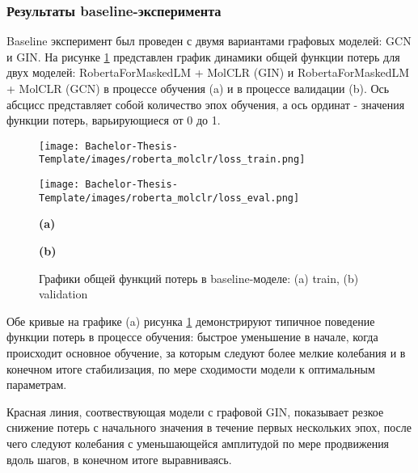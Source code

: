 \subsubsection{Результаты baseline-эксперимента}
Baseline эксперимент был проведен с двумя вариантами графовых моделей: GCN и GIN.
На рисунке \ref{fig:loss_bimodal} представлен график динамики общей функции потерь для двух моделей: RobertaForMaskedLM + MolCLR (GIN) и RobertaForMaskedLM + MolCLR (GCN) в процессе обучения (a) и в процессе валидации (b). Ось абсцисс представляет собой количество эпох обучения, а ось ординат - значения функции потерь, варьирующиеся от 0 до 1.

\begin{figure}[h]
    \begin{minipage}{0.5\textwidth}
        \centering
        \texttt{[image: Bachelor-Thesis-Template/images/roberta\_molclr/loss\_train.png]}
    \end{minipage}%
    \begin{minipage}{0.5\textwidth}
        \centering
        \texttt{[image: Bachelor-Thesis-Template/images/roberta\_molclr/loss\_eval.png]}
    \end{minipage}%

    \newline
    \begin{minipage}{0.5\textwidth}
      \centering
    \textbf{(a)}
    \end{minipage}%
    \begin{minipage}{0.5\textwidth}
    \centering
    \textbf{(b)}
    \end{minipage}%
    
    \caption{\small Графики общей функций потерь в baseline-моделе: (a) train, (b) validation}
    \label{fig:loss_bimodal}
\end{figure}

Обе кривые на графике (a) рисунка \ref{fig:loss_bimodal} демонстрируют типичное поведение функции потерь в процессе обучения: быстрое уменьшение в начале, когда происходит основное обучение, за которым следуют более мелкие колебания и в конечном итоге стабилизация, по мере сходимости модели к оптимальным параметрам.

Красная линия, соотвествующая модели с графовой GIN, показывает резкое снижение потерь с начального значения в течение первых нескольких эпох, после чего следуют колебания с уменьшающейся амплитудой по мере продвижения вдоль шагов, в конечном итоге выравниваясь.

